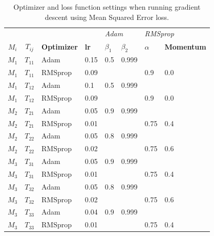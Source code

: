 \begin{table}[h]
\centering
\begin{tabular}{ccllllll}
\textbf{}      &                   & \textbf{}          & \multicolumn{1}{l|}{}            & \multicolumn{2}{l|}{\textit{Adam}}                           & \multicolumn{2}{l|}{\textit{RMSprop}}                      \\
\textbf{$M_i$} & \textbf{$T_{ij}$} & \textbf{Optimizer} & \multicolumn{1}{l|}{\textbf{lr}} & \textbf{$\beta_1$} & \multicolumn{1}{l|}{\textbf{$\beta_2$}} & \textbf{$\alpha$} & \multicolumn{1}{l|}{\textbf{Momentum}} \\ \hline
 $M_1$      & $T_{11}$   & Adam       & 0.15       & 0.5        & 0.999      &            &           \\
 $M_1$      & $T_{11}$   & RMSprop    & 0.09       &            &            & 0.9        & 0.0       \\
 $M_1$      & $T_{12}$   & Adam       & 0.1        & 0.5        & 0.999      &            &           \\
 $M_1$      & $T_{12}$   & RMSprop    & 0.09       &            &            & 0.9        & 0.0       \\
 $M_2$      & $T_{21}$   & Adam       & 0.05       & 0.9        & 0.999      &            &           \\
 $M_2$      & $T_{21}$   & RMSprop    & 0.01       &            &            & 0.75       & 0.4       \\
 $M_2$      & $T_{22}$   & Adam       & 0.05       & 0.8        & 0.999      &            &           \\
 $M_2$      & $T_{22}$   & RMSprop    & 0.02       &            &            & 0.75       & 0.6       \\
 $M_3$     & $T_{31}$   & Adam       & 0.05       & 0.9        & 0.999      &            &            \\
 $M_3$     & $T_{31}$   & RMSprop    & 0.01       &            &            & 0.75       & 0.4        \\
 $M_3$     & $T_{32}$   & Adam       & 0.05       & 0.8        & 0.999      &            &            \\
 $M_3$     & $T_{32}$   & RMSprop    & 0.02       &            &            & 0.75       & 0.6        \\
 $M_3$     & $T_{33}$   & Adam       & 0.04       & 0.9        & 0.999      &            &            \\
 $M_3$     & $T_{33}$   & RMSprop    & 0.01       &            &            & 0.75       & 0.4        \\
\end{tabular}
\caption{Optimizer and loss function settings when running gradient descent using Mean Squared Error loss.}
\label{tab:MSEOptimizerSettings}
\end{table}

